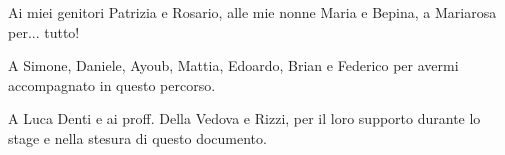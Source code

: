 \begin{flushright}
Ai miei genitori Patrizia e Rosario, alle mie nonne Maria e Bepina, a Mariarosa per... tutto!

\bigskip

A Simone, Daniele, Ayoub, Mattia, Edoardo, Brian e Federico per avermi accompagnato in questo percorso.

\bigskip

A Luca Denti e ai proff. Della Vedova e Rizzi, per il loro supporto durante lo stage e nella stesura di questo documento.

\end{flushright}